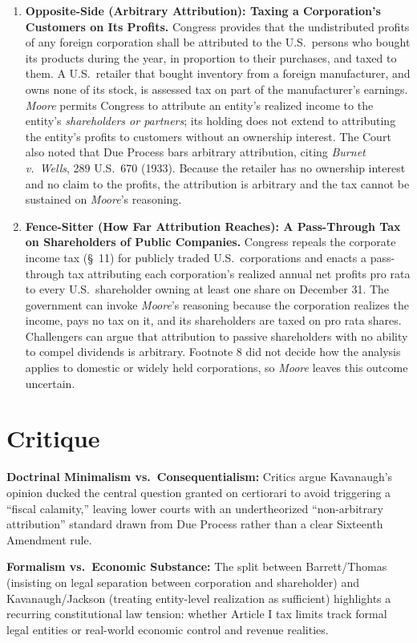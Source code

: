 \documentclass[12pt]{article}
\begin{document}
\begin{enumerate}
\item \textbf{Opposite-Side (Arbitrary Attribution): Taxing a Corporation's Customers on Its Profits.} Congress provides that the undistributed profits of any foreign corporation shall be attributed to the U.S.\ persons who bought its products during the year, in proportion to their purchases, and taxed to them. A U.S.\ retailer that bought inventory from a foreign manufacturer, and owns none of its stock, is assessed tax on part of the manufacturer's earnings. \textit{Moore} permits Congress to attribute an entity's realized income to the entity's \emph{shareholders or partners}; its holding does not extend to attributing the entity's profits to customers without an ownership interest. The Court also noted that Due Process bars arbitrary attribution, citing \textit{Burnet v.\ Wells}, 289 U.S.\ 670 (1933). Because the retailer has no ownership interest and no claim to the profits, the attribution is arbitrary and the tax cannot be sustained on \textit{Moore}'s reasoning.

\item \textbf{Fence-Sitter (How Far Attribution Reaches): A Pass-Through Tax on Shareholders of Public Companies.} Congress repeals the corporate income tax (\S\ 11) for publicly traded U.S.\ corporations and enacts a pass-through tax attributing each corporation's realized annual net profits pro rata to every U.S.\ shareholder owning at least one share on December 31. The government can invoke \textit{Moore}'s reasoning because the corporation realizes the income, pays no tax on it, and its shareholders are taxed on pro rata shares. Challengers can argue that attribution to passive shareholders with no ability to compel dividends is arbitrary. Footnote 8 did not decide how the analysis applies to domestic or widely held corporations, so \textit{Moore} leaves this outcome uncertain.

\end{enumerate}

\section{Critique}
\textbf{Doctrinal Minimalism vs.\ Consequentialism:} Critics argue Kavanaugh's opinion ducked the central question granted on certiorari to avoid triggering a ``fiscal calamity,'' leaving lower courts with an undertheorized ``non-arbitrary attribution'' standard drawn from Due Process rather than a clear Sixteenth Amendment rule.

\textbf{Formalism vs.\ Economic Substance:} The split between Barrett/Thomas (insisting on legal separation between corporation and shareholder) and Kavanaugh/Jackson (treating entity-level realization as sufficient) highlights a recurring constitutional law tension: whether Article I tax limits track formal legal entities or real-world economic control and revenue realities.
\end{document}
